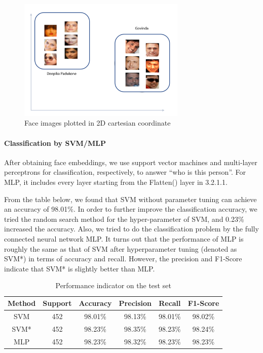 \begin{figure}[H]
    \centering\includegraphics[width=8cm]{./figures/facenet4.png}
    \caption{Face images plotted in 2D cartesian coordinate}
    \label{pic:facenet4}
\end{figure}


\paragraph{Classification by SVM/MLP}
After obtaining face embeddings, we use support vector machines and multi-layer perceptrons for classification, respectively, to answer ``who is this person''. For MLP, it includes every layer starting from the Flatten() layer in 3.2.1.1.

From the table below, we found that SVM without parameter tuning can achieve an accuracy of 98.01\%. In order to further improve the classification accuracy, we tried the random search method for the hyper-parameter of SVM, and 0.23\% increased the accuracy. Also, we tried to do the classification problem by the fully connected neural network MLP. It turns out that the performance of MLP is roughly the same as that of SVM after hyperparameter tuning (denoted as SVM*) in terms of accuracy and recall. However, the precision and F1-Score indicate that SVM* is slightly better than MLP.

\begin{table}[!htbp]
    \small
	\centering
	\begin{tabularx}{0.7\textwidth}{cccccc}
		\toprule
		\textbf{Method} & \textbf{Support}
       &  \textbf{Accuracy}
        & \textbf{Precision} 
        & \textbf{Recall} 
        & \textbf{F1-Score} \\

        \midrule
        SVM & 452& 98.01\% & 98.13\% & 98.01\% & 98.02\%\\
        SVM* & 452& 98.23\% & 98.35\% & 98.23\% & 98.24\%\\
        MLP & 452& 98.23\% & 98.32\% & 98.23\% & 98.23\%\\
        
        
		\bottomrule
	\end{tabularx}%
	\label{tab:result3}%
	\caption{ Performance indicator on the test set}
\end{table}%


